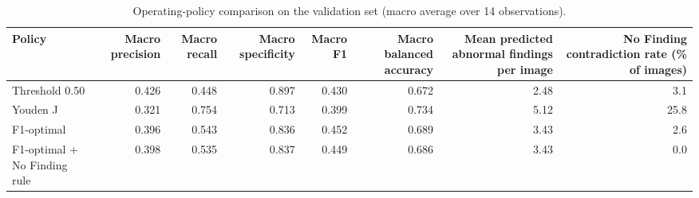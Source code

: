 \begin{table}[t]
\centering
\small
\begin{tabular}{lrrrrrrr}
\hline
Policy & Macro precision & Macro recall & Macro specificity & Macro F1 & Macro balanced accuracy & Mean predicted abnormal findings per image & No Finding contradiction rate (\% of images) \\
\hline
Threshold 0.50 & 0.426 & 0.448 & 0.897 & 0.430 & 0.672 & 2.48 & 3.1 \\
Youden J & 0.321 & 0.754 & 0.713 & 0.399 & 0.734 & 5.12 & 25.8 \\
F1-optimal & 0.396 & 0.543 & 0.836 & 0.452 & 0.689 & 3.43 & 2.6 \\
F1-optimal + No Finding rule & 0.398 & 0.535 & 0.837 & 0.449 & 0.686 & 3.43 & 0.0 \\
\hline
\end{tabular}
\caption{Operating-policy comparison on the validation set (macro average over 14 observations).}
\label{tab:table1_policy_comparison}
\end{table}

